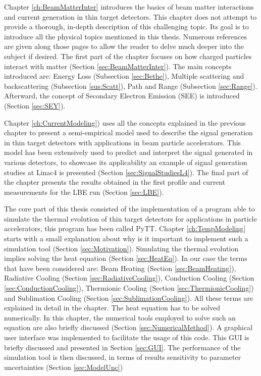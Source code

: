 Chapter \ref{ch:BeamMatterInter} introduces the basics of beam matter interactions and current generation in thin target detectors. This chapter does not attempt to provide a thorough, in-depth description of this challenging topic. Its goal is to introduce all the physical topics mentioned in this thesis. Numerous references are given along those pages to allow the reader to delve much deeper into the subject if desired. The first part of the chapter focuses on how charged particles interact with matter (Section \ref{sec:BeamMatterInter}). The main concepts introduced are: Energy Loss (Subsection \ref{sec:Bethe}), Multiple scattering and backscattering (Subsection \ref{sus:Scatt}), Path and Range (Subsection \ref{sec:Range}). Afterward, the concept of Secondary Electron Emission (SEE) is introduced (Section \ref{sec:SEY}). 

Chapter \ref{ch:CurrentModeling}) uses all the concepts explained in the previous chapter to present a semi-empirical model used to describe the signal generation in thin target detectors with applications in beam particle accelerators. This model has been extensively used to predict and interpret the signal generated in various detectors, to showcase its applicability an example of signal generation studies at Linac4 is presented (Section \ref{sec:SignalStudiesL4}). The final part of the chapter presents the results obtained in the first profile and current measurements for the LBE run (Section \ref{sec:LBE}). 

The core part of this thesis consisted of the implementation of a program able to simulate the thermal evolution of thin target detectors for applications in particle accelerators, this program has been called PyTT. Chapter \ref{ch:TempModeling} starts with a small explanation about why is it important to implement such a simulation tool (Section \ref{sec:Motivation}). Simulating the thermal evolution implies solving the heat equation (Section \ref{sec:HeatEq}). In our case the terms that have been considered are: Beam Heating (Section \ref{sec:BeamHeating}), Radiative Cooling (Section \ref{sec:RadiativeCooling}), Conduction Cooling (Section \ref{sec:ConductionCooling}), Thermionic Cooling (Section \ref{sec:ThermionicCooling}) and Sublimation Cooling (Section \ref{sec:SublimationCooling}). All these terms are explained in detail in the chapter. The heat equation has to be solved numerically. In this chapter, the numerical tools employed to solve such an equation are also briefly discussed (Section \ref{sec:NumericalMethod}). A graphical user interface was implemented to facilitate the usage of this code. This GUI is briefly discussed and presented in Section \ref{sec:GUI}. The performance of the simulation tool is then discussed, in terms of results sensitivity to parameter uncertainties (Section \ref{sec:ModelUnc})

